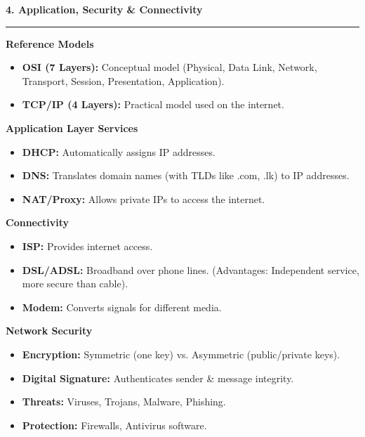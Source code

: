 \documentclass[a4paper, 8pt]{extarticle}
\newcommand{\sectionheading}[1]{\large\textbf{#1}\par\noindent\rule{\linewidth}{0.4pt}}
\newcommand{\subsectionheading}[1]{\normalsize\textbf{#1}}
\begin{document}
\begin{multicols}{2}
\vspace{1em}
\sectionheading{4. Application, Security & Connectivity}
\vspace{0.5em}
\subsectionheading{Reference Models}
\begin{itemize}
    \item \textbf{OSI (7 Layers):} Conceptual model (Physical, Data Link, Network, Transport, Session, Presentation, Application).
    \item \textbf{TCP/IP (4 Layers):} Practical model used on the internet.
\end{itemize}
\subsectionheading{Application Layer Services}
\begin{itemize}
    \item \textbf{DHCP:} Automatically assigns IP addresses.
    \item \textbf{DNS:} Translates domain names (with TLDs like .com, .lk) to IP addresses.
    \item \textbf{NAT/Proxy:} Allows private IPs to access the internet.
\end{itemize}
\subsectionheading{Connectivity}
\begin{itemize}
    \item \textbf{ISP:} Provides internet access.
    \item \textbf{DSL/ADSL:} Broadband over phone lines. (Advantages: Independent service, more secure than cable).
    \item \textbf{Modem:} Converts signals for different media.
\end{itemize}
\subsectionheading{Network Security}
\begin{itemize}
    \item \textbf{Encryption:} Symmetric (one key) vs. Asymmetric (public/private keys).
    \item \textbf{Digital Signature:} Authenticates sender \& message integrity.
    \item \textbf{Threats:} Viruses, Trojans, Malware, Phishing.
    \item \textbf{Protection:} Firewalls, Antivirus software.
\end{itemize}

\end{multicols}
\end{document}
